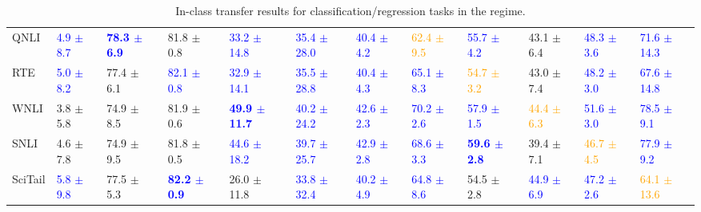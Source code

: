 \begin{landscape}
\begin{table}[t]
\begin{adjustbox}{max width=2\textwidth}
\begin{tabular}{ l l l l l  l l l l  l l l }
QNLI & \textcolor{blue}{4.9 $\pm$ 8.7} & \textbf{\textcolor{blue}{78.3 $\pm$ 6.9}} & 81.8 $\pm$ 0.8 & \textcolor{blue}{33.2 $\pm$ 14.8} & \textcolor{blue}{35.4 $\pm$ 28.0} & \textcolor{blue}{40.4 $\pm$ 4.2} & \textcolor{orange}{62.4 $\pm$ 9.5} & \textcolor{blue}{55.7 $\pm$ 4.2} & 43.1 $\pm$ 6.4 & \textcolor{blue}{48.3 $\pm$ 3.6} & \textcolor{blue}{71.6 $\pm$ 14.3}\\
RTE & \textcolor{blue}{5.0 $\pm$ 8.2} & 77.4 $\pm$ 6.1 & \textcolor{blue}{82.1 $\pm$ 0.8} & \textcolor{blue}{32.9 $\pm$ 14.1} & \textcolor{blue}{35.5 $\pm$ 28.8} & \textcolor{blue}{40.4 $\pm$ 4.3} & \textcolor{blue}{65.1 $\pm$ 8.3} & \textcolor{orange}{54.7 $\pm$ 3.2} & 43.0 $\pm$ 7.4 & \textcolor{blue}{48.2 $\pm$ 3.0} & \textcolor{blue}{67.6 $\pm$ 14.8}\\
WNLI & 3.8 $\pm$ 5.8 & 74.9 $\pm$ 8.5 & 81.9 $\pm$ 0.6 & \textbf{\textcolor{blue}{49.9 $\pm$ 11.7}} & \textcolor{blue}{40.2 $\pm$ 24.2} & \textcolor{blue}{42.6 $\pm$ 2.3} & \textcolor{blue}{70.2 $\pm$ 2.6} & \textcolor{blue}{57.9 $\pm$ 1.5} & \textcolor{orange}{44.4 $\pm$ 6.3} & \textcolor{blue}{51.6 $\pm$ 3.0} & \textcolor{blue}{78.5 $\pm$ 9.1}\\
SNLI & 4.6 $\pm$ 7.8 & 74.9 $\pm$ 9.5 & 81.8 $\pm$ 0.5 & \textcolor{blue}{44.6 $\pm$ 18.2} & \textcolor{blue}{39.7 $\pm$ 25.7} & \textcolor{blue}{42.9 $\pm$ 2.8} & \textcolor{blue}{68.6 $\pm$ 3.3} & \textbf{\textcolor{blue}{59.6 $\pm$ 2.8}} & 39.4 $\pm$ 7.1 & \textcolor{orange}{46.7 $\pm$ 4.5} & \textcolor{blue}{77.9 $\pm$ 9.2}\\
SciTail & \textcolor{blue}{5.8 $\pm$ 9.8} & 77.5 $\pm$ 5.3 & \textbf{\textcolor{blue}{82.2 $\pm$ 0.9}} & 26.0 $\pm$ 11.8 & \textcolor{blue}{33.8 $\pm$ 32.4} & \textcolor{blue}{40.2 $\pm$ 4.9} & \textcolor{blue}{64.8 $\pm$ 8.6} & 54.5 $\pm$ 2.8 & \textcolor{blue}{44.9 $\pm$ 6.9} & \textcolor{blue}{47.2 $\pm$ 2.6} & \textcolor{orange}{64.1 $\pm$ 13.6}\\
\bottomrule
\end{tabular}
\end{adjustbox}
\caption{In-class transfer results for classification/regression tasks in the  regime.}
\label{tbla4c}
\end{table}
\end{landscape}